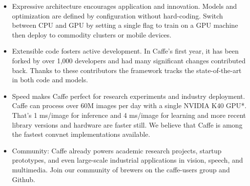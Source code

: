 \documentclass[conference]{IEEEtran}
\begin{document}
\begin{itemize}
	\item Expressive architecture encourages application and innovation. Models and optimization are defined by configuration without hard-coding. Switch between CPU and GPU by setting a single flag to train on a GPU machine then deploy to commodity clusters or mobile devices.
	\item Extensible code fosters active development. In Caffe’s first year, it has been forked by over 1,000 developers and had many significant changes contributed back. Thanks to these contributors the framework tracks the state-of-the-art in both code and models.
	\item Speed makes Caffe perfect for research experiments and industry deployment. Caffe can process over 60M images per day with a single NVIDIA K40 GPU*. That’s 1 ms/image for inference and 4 ms/image for learning and more recent library versions and hardware are faster still. We believe that Caffe is among the fastest convnet implementations available.
	\item Community: Caffe already powers academic research projects, startup prototypes, and even large-scale industrial applications in vision, speech, and multimedia. Join our community of brewers on the caffe-users group and Github.
	
\end{itemize}
\end{document}
